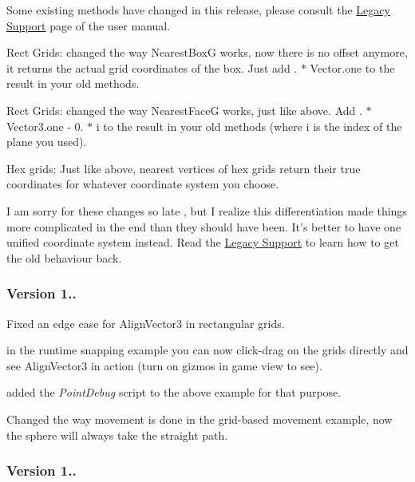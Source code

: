 Some existing methods have changed in this release, please consult the \hyperlink{legacy_support}{Legacy Support} page of the user manual.
\begin{DoxyItemize}
\item Rect Grids\+: changed the way {\ttfamily Nearest\+Box\+G} works, now there is no offset anymore, it returns the actual grid coordinates of the box. Just add {. $\ast$ Vector.\+one} to the result in your old methods.
\item Rect Grids\+: changed the way {\ttfamily Nearest\+Face\+G} works, just like above. Add {. $\ast$ Vector3.\+one -\/ 0. $\ast$ i} to the result in your old methods (where {\ttfamily i} is the index of the plane you used).
\item Hex grids\+: Just like above, nearest vertices of hex grids return their true coordinates for whatever coordinate system you choose.
\end{DoxyItemize}

I am sorry for these changes so late , but I realize this differentiation made things more complicated in the end than they should have been. It's better to have one unified coordinate system instead. Read the \hyperlink{legacy_support}{Legacy Support} to learn how to get the old behaviour back.

\subsubsection*{Version 1..}


\begin{DoxyItemize}
\item Fixed an edge case for {\ttfamily Align\+Vector3} in rectangular grids.
\item in the runtime snapping example you can now click-\/drag on the grids directly and see {\ttfamily Align\+Vector3} in action (turn on gizmos in game view to see).
\item added the {\itshape Point\+Debug} script to the above example for that purpose.
\item Changed the way movement is done in the grid-\/based movement example, now the sphere will always take the straight path.
\end{DoxyItemize}

\subsubsection*{Version 1..}

